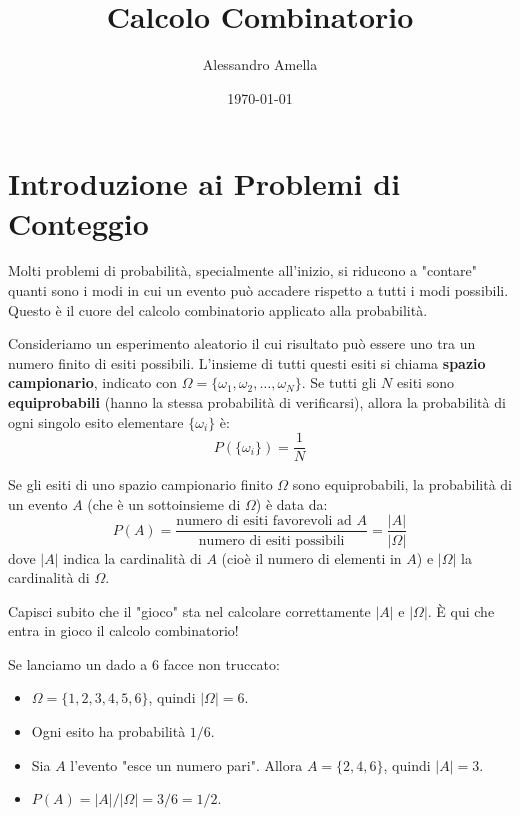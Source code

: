 

\title{Calcolo Combinatorio}
\author{Alessandro Amella}
\date{\today}



\maketitle
\tableofcontents
\newpage

\section{Introduzione ai Problemi di Conteggio}
Molti problemi di probabilità, specialmente all'inizio, si riducono a "contare" quanti sono i modi in cui un evento può accadere rispetto a tutti i modi possibili. Questo è il cuore del calcolo combinatorio applicato alla probabilità.

\begin{definition}
Consideriamo un esperimento aleatorio il cui risultato può essere uno tra un numero finito di esiti possibili. L'insieme di tutti questi esiti si chiama \textbf{spazio campionario}, indicato con $\Omega = \{\omega_1, \omega_2, \dots, \omega_N\}$.
Se tutti gli $N$ esiti sono \textbf{equiprobabili} (hanno la stessa probabilità di verificarsi), allora la probabilità di ogni singolo esito elementare $\{\omega_i\}$ è:
$$ P(\{\omega_i\}) = \frac{1}{N} $$
\end{definition}

\begin{theorem}
Se gli esiti di uno spazio campionario finito $\Omega$ sono equiprobabili, la probabilità di un evento $A$ (che è un sottoinsieme di $\Omega$) è data da:
$$ P(A) = \frac{\text{numero di esiti favorevoli ad } A}{\text{numero di esiti possibili}} = \frac{|A|}{|\Omega|} $$
dove $|A|$ indica la cardinalità di $A$ (cioè il numero di elementi in $A$) e $|\Omega|$ la cardinalità di $\Omega$.
\end{theorem}

\begin{remark}
Capisci subito che il "gioco" sta nel calcolare correttamente $|A|$ e $|\Omega|$. È qui che entra in gioco il calcolo combinatorio!
\end{remark}

\begin{example}
Se lanciamo un dado a 6 facce non truccato:
\begin{itemize}
    \item $\Omega = \{1, 2, 3, 4, 5, 6\}$, quindi $|\Omega|=6$.
    \item Ogni esito ha probabilità $1/6$.
    \item Sia $A$ l'evento "esce un numero pari". Allora $A = \{2, 4, 6\}$, quindi $|A|=3$.
    \item $P(A) = |A|/|\Omega| = 3/6 = 1/2$.
\end{itemize}
\end{example}

